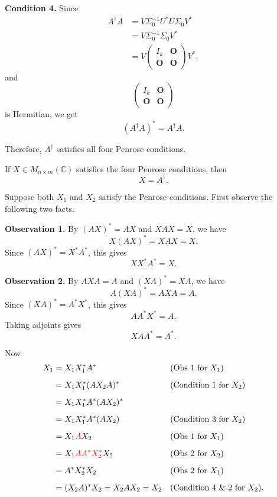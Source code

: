 \begin{pfbox}
\textbf{Condition 4.}
Since
\begin{align*}
A^\dagger A
&=
V\Sigma_0^{-1}U^*
U\Sigma_0V^* \\
&=
V\Sigma_0^{-1}\Sigma_0V^* \\
&=
V
\begin{pmatrix}
I_k & \mathbf{O} \\
\mathbf{O} & \mathbf{O}
\end{pmatrix}
V^*,
\end{align*}
and
\[
\begin{pmatrix}
I_k & \mathbf{O} \\
\mathbf{O} & \mathbf{O}
\end{pmatrix}
\]
is Hermitian, we get
\[
(A^\dagger A)^*
=
A^\dagger A.
\]

Therefore, $A^\dagger$ satisfies all four Penrose conditions.
\end{pfbox}

\begin{theorem}
If $X\in M_{n\times m}(\mathbb{C})$ satisfies the four Penrose conditions, then
\[
X=A^\dagger.
\]
\end{theorem}

\begin{pfbox}
Suppose both $X_1$ and $X_2$ satisfy the Penrose conditions.
First observe the following two facts.

\textbf{Observation 1.}
By $(AX)^*=AX$ and $XAX=X$, we have
\[
X(AX)^*=XAX=X.
\]
Since $(AX)^*=X^*A^*$, this gives
\[
XX^*A^*=X.
\]

\textbf{Observation 2.}
By $AXA=A$ and $(XA)^*=XA$, we have
\[
A(XA)^*=AXA=A.
\]
Since $(XA)^*=A^*X^*$, this gives
\[
AA^*X^*=A.
\]
Taking adjoints gives
\[
XA A^*=A^*.
\]

Now 
\begin{align*}
X_1
&= X_1X_1^*A^*
    && (\text{Obs 1 for } X_1) \\[2mm]
&= X_1X_1^*(AX_2A)^*
    && (\text{Condition 1 for } X_2) \\[2mm]
&= X_1X_1^*A^*(AX_2)^* \\[2mm]
&= X_1X_1^*A^*(AX_2)
    && (\text{Condition 3 for } X_2) \\[2mm]
&= X_1\textcolor{red}{A}X_2
    && (\text{Obs 1 for } X_1) \\[2mm]
&= X_1\textcolor{red}{AA^*X^*_2}X_2
    && (\text{Obs 2 for } X_2) \\[2mm]
&= A^*X^*_2X_2
  && (\text{Obs 2 for } X_1) \\[2mm]
&= (X_2A)^*X_2 = X_2AX_2 = X_2
  && (\text{Condition 4 \& 2 for } X_2). \\[2mm]
\end{align*}
\end{pfbox}

